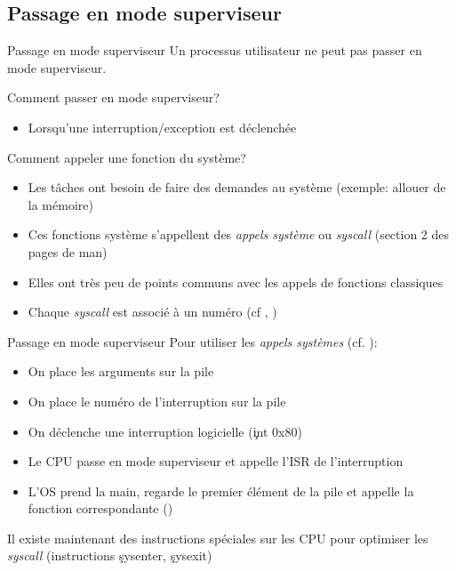 \subsection{Passage en mode superviseur}

\begin{frame}{Passage en mode superviseur}
  Un processus utilisateur ne peut pas passer en mode superviseur.

  Comment passer en mode superviseur?
  \begin{itemize}
  \item Lorsqu'une interruption/exception est déclenchée
  \end{itemize}

  Comment appeler une fonction du système?
  \begin{itemize}
  \item  Les  tâches ont  besoin  de  faire  des demandes  au  système
    (exemple: allouer de la mémoire)
  \item Ces fonctions système s'appellent des \emph{appels système} ou
    \emph{syscall} (section 2 des pages de man)
  \item  Elles ont  très  peu de  points  communs avec  les appels  de
    fonctions classiques
  \item   Chaque  \emph{syscall}   est   associé  à   un  numéro   (cf
     , )
  \end{itemize}

\end{frame}

\begin{frame}{Passage en mode superviseur}
  Pour utiliser les \emph{appels systèmes} (cf. ):
  \begin{itemize}
  \item On place les arguments sur la pile
  \item On place le numéro de l'interruption sur la pile
  \item On déclenche une interruption logicielle (\c{int 0x80})
  \item  Le  CPU  passe  en  mode  superviseur  et  appelle  l'ISR  de
    l'interruption
  \item L'OS prend  la main, regarde le premier élément  de la pile et
    appelle la fonction correspondante ()
  \end{itemize}
  Il  existe maintenant des  instructions spéciales  sur les  CPU pour
  optimiser    les    \emph{syscall}    (instructions    \c{sysenter},
  \c{sysexit})
\end{frame}

